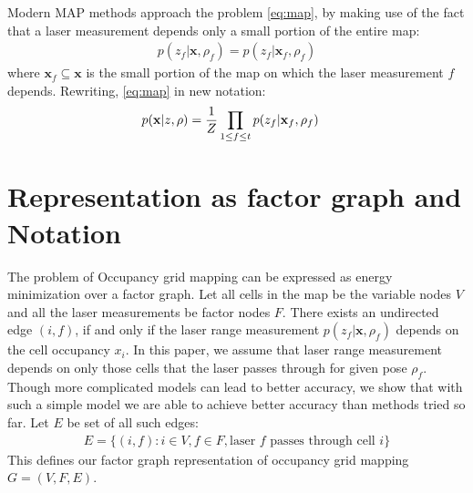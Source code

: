 \documentclass[letterpaper, 10 pt, conference]{ieeeconf} %
\newcommand{\vect}[1]{\mathbf{#1}}
\begin{document}
   Modern MAP methods approach the problem \eqref{eq:map}, by making use of the fact that a laser measurement depends only a small portion of the entire map:
   \begin{align}
     p(z_f |\vect{x}, \rho_f) = p(z_f|\vect{x}_f, \rho_f)
   \end{align}
   where $\vect{x}_f \subseteq \vect{x}$ is the small portion of the map on which the laser measurement $f$ depends. Rewriting, \eqref{eq:map} in new notation:
   \begin{align}
     p(\map | z, \rho) &= \frac{1}{Z} \prod_{1 \le f \le t} p(z_f|\map_f, \rho_f)
     \label{eq:modernmap}
   \end{align}


\section{Representation as factor graph and Notation}
\label{sec:notation}
The problem of Occupancy grid mapping can be expressed as energy minimization
over a factor graph. Let all cells in the map be the variable nodes $V$ and all
the laser measurements be factor nodes $F$. 
There exists an undirected edge $(i, f)$, if and only if the laser
range measurement $p(z_f|\vect{x}, \rho_f)$ depends on the cell occupancy 
$x_i$. In this paper, we assume that laser range measurement depends on only
those cells that the laser passes through for given pose $\rho_f$. Though more
complicated models can lead to better accuracy, we show that with such a simple
model we are able to achieve better accuracy than methods tried so far.
Let $E$ be set of all such edges:
\begin{align}
  E = \{(i, f) : i \in V, f \in F, \text{laser $f$ passes through cell $i$}\}
\end{align}
This defines our factor graph representation of occupancy grid mapping $G = (V, F, E)$.

%
%
\end{document}
